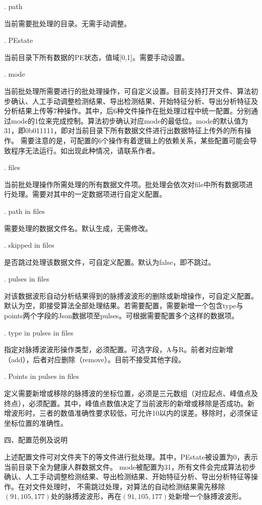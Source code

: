 {. path 

当前需要批处理的目录。无需手动调整。

. PEstate

当前目录下所有数据的PE状态，值域[0,1]。需要手动设置。

. mode

当前批处理所需要进行的批处理操作，可自定义设置。目前支持打开文件、算法初步确认、人工手动调整检测结果、导出检测结果、开始特征分析、导出分析特征及分析结果上传等7种操作。其中，后6种文件操作在批处理过程中统一配置。分别通过mode的1位来完成控制。算法初步确认对应mode的最低位。mode的默认值为31，即0b011111，即对当前目录下所有数据文件进行出数据特征上传外的所有操作。
需要注意的是，可配置的6个操作有着逻辑上的依赖关系，某些配置可能会导致程序无法运行。如出现此种情况，请联系作者。

. files

当前批处理操作所需处理的所有数据文件项。批处理会依次对file中所有数据项进行处理。需要对其中的一定数据项进行自定义配置。

. path in files

需要处理的数据文件名。默认生成，无需修改。

. skipped in files

是否跳过处理该数据文件，可自定义配置。默认为false，即不跳过。

. pulses in files

对该数据波形自动分析结果得到的脉搏波波形的删除或新增操作，可自定义配置。默认为空，即接受算法全部处理结果。若需要配置，需要新增一个包含type与points两个字段的Json数据项至pulses。可根据需要配置多个这样的数据项。

. type in pulses in files

指定对脉搏波波形操作类型，必须配置。可选字段，A与R。前者对应新增（add），后者对应删除（remove）。目前不接受其他字段。

. Points in pulses in files

定义需要新增或移除的脉搏波的坐标位置，必须是三元数组（对应起点、峰值点及终点），必须配置。其中，峰值点数值决定了当前波形的新增或移除是否成功。新增波形时，三者的数值准确性要求较低，可允许10以内的误差。移除时，必须保证坐标位置的准确性。

四、配置范例及说明



上述配置文件可对文件夹下的等文件进行批处理。其中，PEstate被设置为0，表示当前目录下全为健康人群数据文件。
mode被配置为31，所有文件会完成算法初步确认、人工手动调整检测结果、导出检测结果、开始特征分析、导出分析特征等操作。在对文件处理时，
不需跳过处理，对算法的自动检测结果需先移除$(91,105,177)$处的脉搏波波形，再在$(91,105,177)$处新增一个脉搏波波形。
}